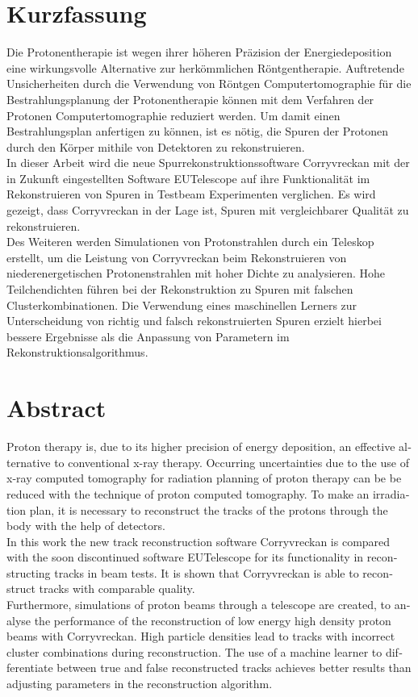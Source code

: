 \thispagestyle{plain}

\section*{Kurzfassung}
Die Protonentherapie ist wegen ihrer höheren Präzision der Energiedeposition eine wirkungsvolle Alternative zur herkömmlichen Röntgentherapie.
Auftretende Unsicherheiten durch die Verwendung von Röntgen Computertomographie für die Bestrahlungsplanung der Protonentherapie können mit dem Verfahren der Protonen Computertomographie reduziert werden.
Um damit einen Bestrahlungsplan anfertigen zu können, ist es nötig, die Spuren der Protonen durch den Körper mithile von Detektoren zu rekonstruieren. \\
In dieser Arbeit wird die neue Spurrekonstruktionssoftware Corryvreckan mit der in Zukunft eingestellten Software EUTelescope auf ihre Funktionalität im
Rekonstruieren von Spuren in Testbeam Experimenten verglichen. Es wird gezeigt, dass Corryvreckan in der Lage ist, Spuren mit vergleichbarer Qualität zu rekonstruieren.\\
Des Weiteren werden Simulationen von Protonstrahlen durch ein Teleskop erstellt, um die Leistung von Corryvreckan beim Rekonstruieren von niederenergetischen
Protonenstrahlen mit hoher Dichte zu analysieren. Hohe Teilchendichten führen bei der Rekonstruktion zu Spuren mit falschen Clusterkombinationen.
Die Verwendung eines maschinellen Lerners zur Unterscheidung von richtig und falsch rekonstruierten Spuren
erzielt hierbei bessere Ergebnisse als die Anpassung von Parametern im \mbox{Rekonstruktionsalgorithmus}.

\section*{Abstract}
\begin{english}
Proton therapy is, due to its higher precision of energy deposition,
an effective alternative to conventional x-ray therapy. Occurring
uncertainties due to the use of x-ray computed tomography for radiation planning of proton therapy can be
be reduced with the technique of proton computed tomography. To
make an irradiation plan, it is necessary to reconstruct the tracks of the protons
through the body with the help of detectors. \\
In this work the new track reconstruction software Corryvreckan is compared with the soon discontinued
software EUTelescope for its functionality in reconstructing tracks in beam tests.
It is shown that
Corryvreckan is able to reconstruct tracks with comparable quality. \\
Furthermore, simulations of proton beams through a telescope are created,
to analyse the performance of the reconstruction of low energy high density proton beams with Corryvreckan.
High particle densities lead to tracks with incorrect cluster combinations during reconstruction.
The use of a machine learner
to differentiate between true and false reconstructed tracks achieves better results than adjusting parameters in the reconstruction algorithm.


\end{english}
